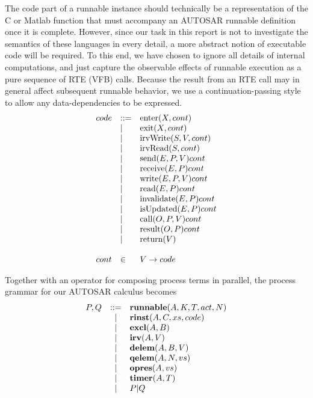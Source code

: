 \documentclass[twocolumn]{article}
\begin{document}
The code part of a runnable instance should technically be a representation of the C or Matlab function that must accompany an AUTOSAR runnable definition once it is complete. However, since our task in this report is not to investigate the semantics of these languages in every detail, a more abstract notion of executable code will be required. To this end, we have chosen to ignore all details of internal computations, and just capture the observable effects of runnable execution as a pure sequence of RTE (VFB) calls. Because the result from an RTE call may in general affect subsequent runnable behavior, we use a continuation-passing style to allow any data-dependencies to be expressed.
\[
\begin{array}{lll}
  \Code & ::= & \Enter{X}{\Cont}                \\
        & |   & \Exit{X}{\Cont}                 \\
        & |   & \IrvWrite{S}{V}{\Cont}          \\
        & |   & \IrvRead{S}{\Cont}              \\
        & |   & \Send{E}{P}{V}{\Cont}           \\
        & |   & \Receive{E}{P}{\Cont}           \\
        & |   & \Write{E}{P}{V}{\Cont}          \\
        & |   & \Read{E}{P}{\Cont}              \\
        & |   & \Invalidate{E}{P}{\Cont}        \\
        & |   & \IsUpdated{E}{P}{\Cont}         \\
        & |   & \Call{O}{P}{V}{\Cont}           \\
        & |   & \Result{O}{P}{\Cont}            \\
        & |   & \Return{V}                      \\
\\
  \Cont & \in & V \rightarrow \Code             \\
\end{array}
\]

Together with an operator for composing process terms in parallel, the process grammar for our AUTOSAR calculus becomes
\[
\begin{array}{rcll}
  P,Q   & ::= & \Trunnable{A}{K}{T}{\Act}{N}    \\
        & |   & \Trinst{A}{C}{\Xs}{\Code}       \\
        & |   & \Texcl{A}{B}                    \\
        & |   & \Tirv{A}{V}                     \\
        & |   & \Tdelem{A}{B}{V}                \\
        & |   & \Tqelem{A}{N}{\Vs}              \\
        & |   & \Topres{A}{\Vs}                 \\
        & |   & \Ttimer{A}{T}                   \\
        & |   & P|Q                             \\
\end{array}
\]
\end{document}
